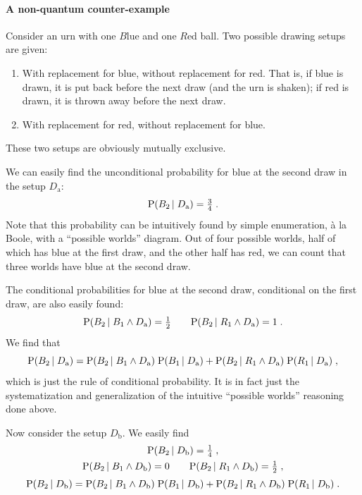 \documentclass[\ifafour a4paper,12pt,\else a5paper,10pt,\fi%
onecolumn,oneside,article,%
british%
]{memoir}
\theoremstyle{remark}
\theoremstyle{innote}
\newcommand*{\p}{\mathrm{P}}%
\renewcommand*{\|}[1][]{\nonscript\,#1\vert\nonscript\;\mathopen{}}
\newcommand*{\yDa}{D_{\textrm{a}}}
\newcommand*{\yDb}{D_{\textrm{b}}}
\begin{document}
\bigskip

\paragraph{A non-quantum counter-example}

Consider an urn with one $B$lue and one $R$ed ball. Two possible
drawing setups are given:
\begin{enumerate}[label=$D_{\textrm{\alph*}}$:,ref=$D_{\textrm{\alph*}}$]
\item\label{item:repB} With replacement for blue, without replacement for
  red. That is, if blue is drawn, it is put back before the next draw (and
  the urn is shaken); if red is drawn, it is thrown away before the next
  draw.
\item\label{item:repR} With replacement for red, without replacement for
  blue.
\end{enumerate}
These two setups are obviously mutually exclusive.

We can easily find the unconditional probability for blue at the
second draw in the setup $\yDa$:
\begin{equation}
  \label{eq:A_red2}
  \p(B_{2} \| \yDa) = \tfrac{3}{4} \;.
\end{equation}
Note that this probability can be intuitively found by simple enumeration,
\`a la Boole, with a \enquote{possible worlds} diagram. Out of four
possible worlds, half of which has blue at the first draw, and the other
half has red, we can count that three worlds have blue at the second draw.

The conditional probabilities for blue at the second draw,
conditional on the first draw, are also easily found:
\begin{equation}
  \label{eq:A_red2cond}
  \p(B_{2} \| B_{1} \land \yDa) = \tfrac{1}{2} \qquad
  \p(B_{2} \| R_{1} \land \yDa) = 1 \;.
\end{equation}
We find that
\begin{equation}
  \label{eq:A_rule}
  \p(B_{2} \| \yDa) =%
  \p(B_{2} \| B_{1} \land \yDa) \; \p( B_{1} \| \yDa) +
  \p(B_{2} \| R_{1} \land \yDa)  \; \p( R_{1} \| \yDa) \;,
\end{equation}
which is just the rule of conditional probability. It is in fact just the
systematization and generalization of the intuitive \enquote{possible
  worlds} reasoning done above.

\medskip

Now consider the setup $\yDb$. We easily find
\begin{gather}
  \label{eq:B_red2}
  \p(B_{2} \| \yDb) = \tfrac{1}{4} \;,
  \\
  \label{eq:B_red2cond}
  \p(B_{2} \| B_{1} \land \yDb) = 0 \qquad
  \p(B_{2} \| R_{1} \land \yDb) = \tfrac{1}{2} \;,
  \\[\jot]
  \label{eq:B_rule}
  \p(B_{2} \| \yDb) =%
  \p(B_{2} \| B_{1} \land \yDb) \; \p( B_{1} \| \yDb) +
  \p(B_{2} \| R_{1} \land \yDb)  \; \p( R_{1} \| \yDb) \;.
\end{gather}
\end{document}
